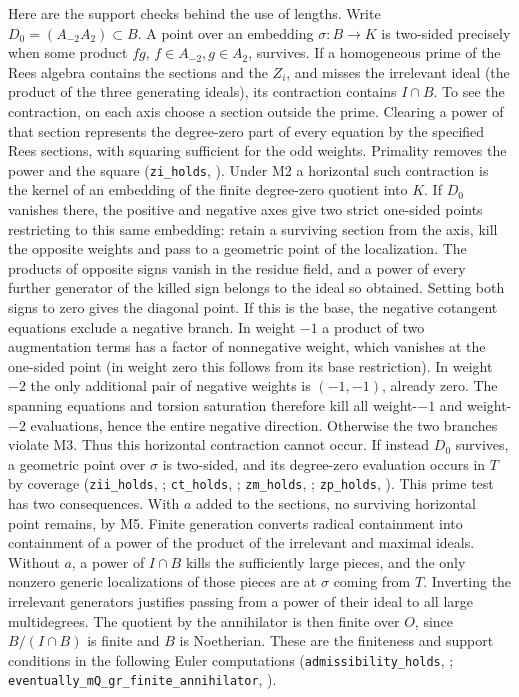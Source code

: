 Here are the support checks behind the use of lengths. Write
$D_0=(A_{-2}A_2)\subset B$. A point over an embedding
$\sigma:B\to K$ is two-sided precisely when some product
$f g$, $f\in A_{-2},g\in A_2$, survives. If a homogeneous prime
of the Rees algebra contains the sections and the $Z_i$, and misses
the irrelevant ideal (the product of the three generating ideals),
its contraction contains $I\cap B$. To see the contraction, on
each axis choose a section outside the prime. Clearing a power of
that section represents the degree-zero part of every equation by
the specified Rees sections, with squaring sufficient for the odd
weights. Primality removes the power and the square
(\nolinkurl{zi_holds}, ).
Under M2 a horizontal such contraction is the kernel of an embedding
of the finite degree-zero quotient into $K$. If $D_0$ vanishes there,
the positive and negative axes give two strict one-sided points
restricting to this same embedding: retain a surviving section from the axis,
kill the opposite weights and pass to a geometric point of the
localization. The products of opposite signs vanish in the residue
field, and a power of every further generator of the killed sign
belongs to the ideal so obtained. Setting both signs to zero gives
the diagonal point. If this is the base, the negative cotangent equations exclude a negative branch.
In weight $-1$ a product of two augmentation terms has a factor of
nonnegative weight, which vanishes at the one-sided point (in weight
zero this follows from its base restriction). In weight $-2$ the only
additional pair of negative weights is $(-1,-1)$, already zero.
The spanning equations and torsion saturation therefore kill all
weight-$-1$ and weight-$-2$ evaluations, hence the entire negative
direction. Otherwise the two branches violate
M3. Thus this horizontal contraction cannot occur. If instead $D_0$
survives, a geometric point over $\sigma$ is two-sided, and its
degree-zero evaluation occurs in $T$ by coverage
(\nolinkurl{zii_holds}, ;
\nolinkurl{ct_holds}, ;
\nolinkurl{zm_holds}, ;
\nolinkurl{zp_holds}, ).
This prime test has two consequences. With $a$ added to the sections,
no surviving horizontal point remains, by M5. Finite generation
converts radical containment into containment of a power of the
product of the irrelevant and maximal ideals. Without $a$, a power
of $I\cap B$ kills the sufficiently large pieces, and the only
nonzero generic localizations of those pieces are at $\sigma$ coming
from $T$. Inverting the irrelevant generators justifies passing from
a power of their ideal to all large multidegrees. The quotient by
the annihilator is then finite over $O$, since $B/(I\cap B)$ is
finite and $B$ is Noetherian. These are the finiteness and support
conditions in the following Euler computations
(\nolinkurl{admissibility_holds}, ;
\nolinkurl{eventually_mQ_gr_finite_annihilator},
).

